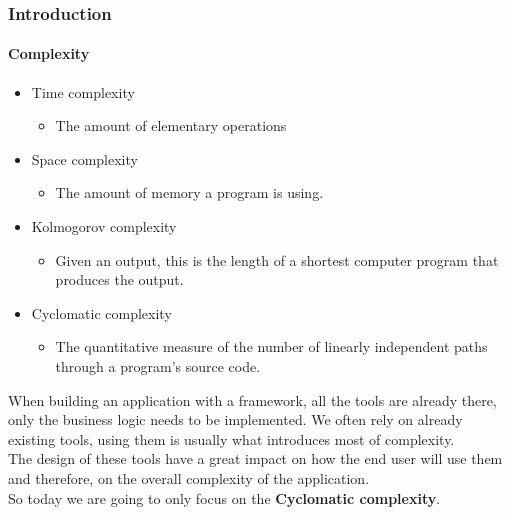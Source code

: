 \begin{frame}
    \frametitle{Introduction}
    \framesubtitle{Complexity}

    \begin{itemize}[<+->]
        \item Time complexity
        \begin{itemize}
            \item The amount of elementary operations
        \end{itemize}
        \item Space complexity
        \begin{itemize}
            \item The amount of memory a program is using.
        \end{itemize}
        \item Kolmogorov complexity
        \begin{itemize}
            \item Given an output, this is the length of a shortest computer
            program that produces the output.
        \end{itemize}
        \item Cyclomatic complexity
        \begin{itemize}
            \item The quantitative measure of the number of linearly
            independent paths through a program's source code.
        \end{itemize}
    \end{itemize}
\end{frame}

\begin{frame}
When building an application with a framework, all the tools are already
there, only the business logic needs to be implemented. We often rely on already
existing tools, using them is usually what introduces most of complexity.
\\
\pause
\vspace{\baselineskip}
The design of these tools have a great impact on how the end user will use them
and therefore, on the overall complexity of the application.
\\
\pause
\vspace{\baselineskip}
So today we are going to only focus on the \textbf{Cyclomatic complexity}.
\end{frame}
